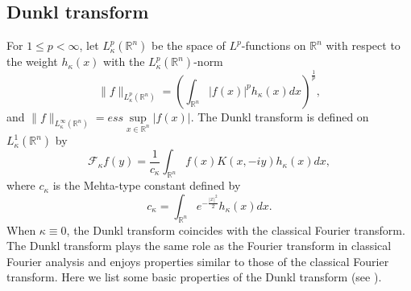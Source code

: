 \documentclass[a4paper,11pt, reqno]{amsart}
\numberwithin{equation}{section}
\theoremstyle{plain}
\theoremstyle{definition}
\theoremstyle{remark}
\begin{document}
\subsection{Dunkl transform} \label{Dunkl transform}
For $1\leq p<\infty$, let $L_\kappa^p\left(\mathbb{R}^{n}\right)$ be the space of $L^p$-functions on $\mathbb{R}^{n}$ with respect to the weight $h_\kappa(x)$ with the $L_\kappa^p\left(\mathbb{R}^{n}\right)$-norm
\begin{equation*}
\|f\|_{L_\kappa^p\left(\mathbb{R}^{n}\right)}=\left(\int_{\mathbb{R}^{n}}|f(x)|^ph_\kappa(x)dx\right)^\frac{1}{p},
\end{equation*}
and $\|f\|_{L_\kappa^\infty\left(\mathbb{R}^{n}\right)}=ess \sup\limits_{x\in\mathbb{R}^n}|f(x)|$.
 The Dunkl transform is defined on $L_\kappa^1\left(\mathbb{R}^{n}\right)$ by
 \begin{equation}\label{Dunkltransform}
 \mathcal{F}_\kappa f(y)=\frac{1}{c_\kappa}\int_{\mathbb{R}^{n}} f(x) K(x,-iy)h_\kappa(x)dx,
 \end{equation}
 where $c_\kappa$ is the Mehta-type constant defined by
 \begin{equation*}
 c_\kappa=\int_{\mathbb{R}^{n}} e^{-\frac{|x|^2}{2}}h_\kappa(x)dx.
 \end{equation*}
When $\kappa \equiv 0$, the Dunkl transform coincides with the classical Fourier transform. The Dunkl transform plays the same role as the Fourier transform in classical Fourier analysis and enjoys properties similar to those of the classical Fourier transform. %
Here we list some basic properties of the Dunkl transform (see \cite{Dunklll, Jeu, Dai-Ye}).
\end{document}
